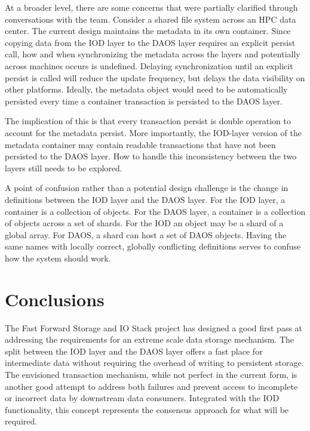 \documentclass[conference]{IEEEtran}
\begin{document}
At a broader level, there are some concerns that were partially clarified
through conversations with the team.  Consider a shared file system across an
HPC data center. The current design maintains the metadata in its own
container. Since copying data from the IOD layer to the DAOS layer requires an
explicit persist call, how and when synchronizing the metadata across the
layers and potentially across machines occurs is undefined. Delaying
synchronization until an explicit persist is called will reduce the update
frequency, but delays the data visibility on other platforms. Ideally, the
metadata object would need to be automatically persisted every time a container
transaction is persisted to the DAOS layer.

The implication of this is that every transaction persist is double operation
to account for the metadata persist. More importantly, the IOD-layer version of
the metadata container may contain readable transactions that have not been
persisted to the DAOS layer. How to handle this inconsistency between the two
layers still needs to be explored.

A point of confusion rather than a potential design challenge is the change in
definitions between the IOD layer and the DAOS layer.  For the IOD layer, a
container is a collection of objects. For the DAOS layer, a container is a
collection of objects across a set of shards. For the IOD an object may be a
shard of a global array.  For DAOS, a shard can host a set of DAOS objects.
Having the same names with locally correct, globally conflicting definitions
serves to confuse how the system should work.

\section{Conclusions}
\label{sec:conclusion}

The Fast Forward Storage and IO Stack project has designed a good first pass at
addressing the requirements for an extreme scale data storage mechanism. The
split between the IOD layer and the DAOS layer offers a fast place for
intermediate data without requiring the overhead of writing to persistent
storage. The envisioned transaction mechanism, while not perfect in the current
form, is another good attempt to address both failures and prevent access to
incomplete or incorrect data by downstream data consumers. Integrated with the
IOD functionality, this concept represents the consensus approach for what will
be required.
\end{document}
